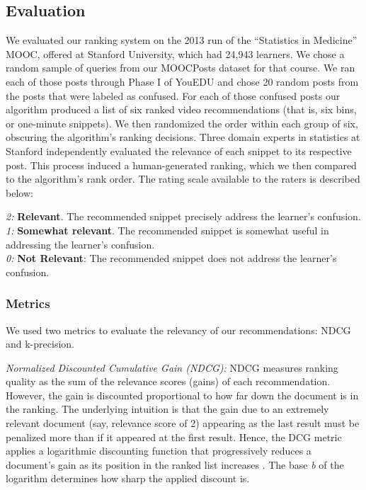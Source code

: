 \documentclass{edm_template}
\begin{document}
\subsection{Evaluation}

We evaluated our ranking system on the 2013 run of the ``Statistics in
Medicine'' MOOC, offered at Stanford University, which had 24,943
learners. We chose a random sample of queries from our MOOCPosts
dataset for that course. We ran each of those posts through Phase I of
YouEDU and chose 20 random posts from the posts that were labeled as
confused. For each of those confused posts our algorithm produced a
list of six ranked video recommendations (that is, six bins, or
one-minute snippets). We then randomized the order within each group
of six, obscuring the algorithm's ranking decisions. Three domain
experts in statistics at Stanford independently evaluated the
relevance of each snippet to its respective post. This process induced
a human-generated ranking, which we then compared to the algorithm's
rank order. The rating scale available to the raters is described
below:

\textit{2:} {\bf Relevant}. The recommended snippet precisely address the learner's confusion.\\
\textit{1:} {\bf Somewhat relevant}. The recommended snippet is somewhat useful in addressing the learner's confusion.\\
\textit{0:} {\bf Not Relevant}: The recommended snippet does not address the learner's confusion.

\subsubsection{Metrics}
We used two metrics to evaluate the relevancy of our recommendations: NDCG and k-precision.

\textit{Normalized Discounted Cumulative Gain (NDCG):}
NDCG measures ranking quality as the sum of the relevance scores (gains) of each recommendation. However, the gain is discounted proportional to how far down the document is in the ranking. The underlying intuition is that the gain due to an extremely relevant document (say, relevance score of 2) appearing as the last result must be penalized more than if it appeared at the first result. Hence, the DCG metric applies a logarithmic discounting function that progressively reduces a document's gain as its position in the ranked list increases \cite{ndcgcite}. The base \textit{b} of the logarithm determines how sharp the applied discount is.
\end{document}
